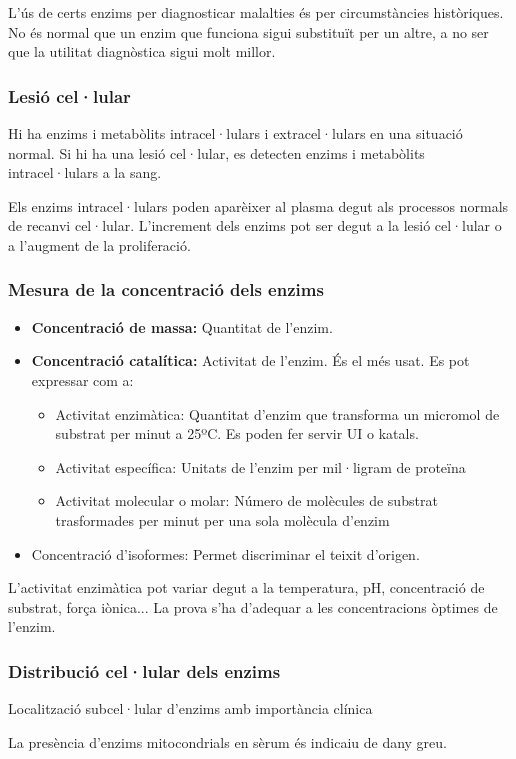 L'ús de certs enzims per diagnosticar malalties és per circumstàncies històriques. No és normal que un enzim que funciona sigui substituït per un altre, a no ser que la utilitat diagnòstica sigui molt millor.

\subsubsection{Lesió cel·lular}
Hi ha enzims i metabòlits intracel·lulars i extracel·lulars en una situació normal. Si hi ha una lesió cel·lular, es detecten enzims i metabòlits intracel·lulars a la sang.

Els enzims intracel·lulars poden aparèixer al plasma degut als processos normals de recanvi cel·lular. L'increment dels enzims pot ser degut a la lesió cel·lular o a l'augment de la proliferació.

\subsubsection{Mesura de la concentració dels enzims}
\begin{itemize}
\item \textbf{Concentració de massa:} Quantitat de l'enzim.
\item \textbf{Concentració catalítica:} Activitat de l'enzim. És el més usat. Es pot expressar com a:
  \begin{itemize}
  \item Activitat enzimàtica: Quantitat d'enzim que transforma un micromol de substrat per minut a 25ºC. Es poden fer servir UI o katals.
  \item Activitat específica: Unitats de l'enzim per mil·ligram de proteïna
  \item Activitat molecular o molar: Número de molècules de substrat trasformades per minut per
una sola molècula d'enzim
  \end{itemize}
\item Concentració d'isoformes: Permet discriminar el teixit d'origen.
\end{itemize}

L'activitat enzimàtica pot variar degut a la temperatura, pH, concentració de substrat, força iònica... La prova s'ha d'adequar a les concentracions òptimes de l'enzim.

\subsubsection{Distribució cel·lular dels enzims}
\begin{table}[H]
  \centering
  
  \caption{Localització subcel·lular d'enzims amb importància clínica}
  \label{tab:enzims}
\end{table}

La presència d'enzims mitocondrials en sèrum és indicaiu de dany greu.

